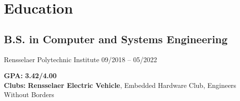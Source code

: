 \documentclass{article}
\begin{document}
\section{Education}
\subsection{B.S. in Computer and Systems Engineering}{Rensselaer Polytechnic Institute \hfill 09/2018 -- 05/2022}
\vspace{-.05in}
\begin{tabbing}
    \hspace{3em} \textbf{GPA:}\hspace{4em} \= \textbf{3.42/4.00} \\
    \hspace{3em} \textbf{Clubs:} \> \textbf{Rensselaer Electric Vehicle}, Embedded Hardware Club, Engineers Without Borders
\end{tabbing}
\end{document}
